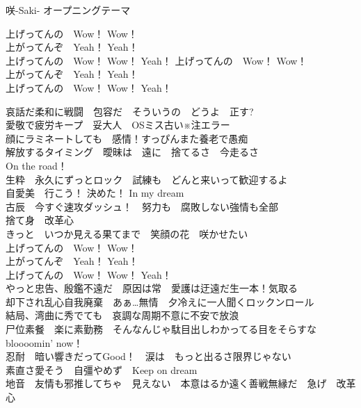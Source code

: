 
{咲-Saki- オープニングテーマ}
{\fontsize{10}{10}\kasho
\begin{multicols}{2}{
  上げってんの　Wow！ Wow！\\
  上がってんぞ　Yeah！ Yeah！\\
  上げってんの　Wow！ Wow！ Yeah！
  \newcolumn
  上げってんの　Wow！ Wow！\\
  上がってんぞ　Yeah！ Yeah！\\
  上げってんの　Wow！ Wow！ Yeah！
  }\end{multicols}
  \vspace{-1.4em}
哀話だ柔和に戦闘　包容だ　そういうの　どうよ　正す?\\
愛敬で疲労キープ　妥大人　OSミス古い$\!$※$\!$注エラー\\[-.3em]

顔にラミネートしても　感情！すっぴんまた養老で愚痴\\
解放するタイミング　曖昧は　遠に　捨てるさ　今走るさ\\[-.3em]

On the road！\\
生粋　永久にずっとロック　試練も　どんと来いって歓迎するよ\\
自愛美　行こう！ 決めた！ In my dream\\
古辰　今すぐ速攻ダッシュ！　努力も　腐敗しない強情も全部\\
捨て身　改革心\\[-.3em]

きっと　いつか見える果てまで　笑顔の花　咲かせたい\\[-.3em]

上げってんの　Wow！ Wow！\\
上がってんぞ　Yeah！ Yeah！\\
上げってんの　Wow！ Wow！ Yeah！\\

やっと忠告、殷鑑不遠だ　原因は常　愛護は迂遠だ生一本！気取る\\
却下され乱心自我廃棄　あぁ…無情　夕冷えに一人聞くロックンロール\\[-.3em]

結局、湾曲に秀でても　哀調な周期不意に不安で放浪\\
尸位素餐　楽に素勤務　そんなんじゃ駄目出しわかってる目をそらすな\\[-.3em]

bloooomin' now！\\
忍耐　暗い響きだってGood！　涙は　もっと出るさ限界じゃない\\
素直さ愛そう　自彊やめず　Keep on dream\\
地音　友情も邪推してちゃ　見えない　本意はるか遠く善戦無縁だ　急げ　改革心\\[-.3em]

}

